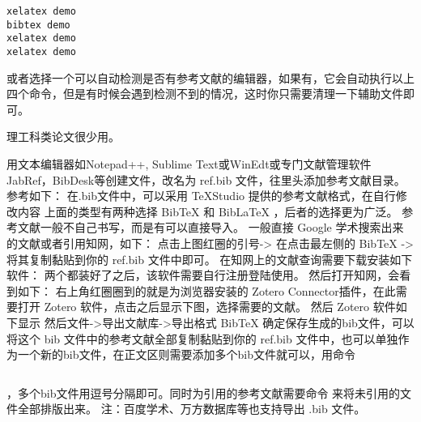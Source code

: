 \begin{verbatim}
xelatex demo
bibtex demo
xelatex demo
xelatex demo
\end{verbatim}

或者选择一个可以自动检测是否有参考文献的编辑器，如果有，它会自动执行以上四个命令，但是有时候会遇到检测不到的情况，这时你只需要清理一下辅助文件即可。



理工科类论文很少用。



用文本编辑器如Notepad++, Sublime
Text或WinEdt或专门文献管理软件JabRef，BibDesk等创建文件，改名为 ref.bib
文件，往里头添加参考文献目录。参考如下：
在.bib文件中，可以采用 TeXStudio 提供的参考文献格式，在自行修改内容
上面的类型有两种选择 BibTeX 和 BibLaTeX ，后者的选择更为广泛。
参考文献一般不自己书写，而是有可以直接导入。 一般直接 Google
学术搜索出来的文献或者引用知网，如下：
点击上图红圈的引号-\textgreater{}
在点击最左侧的 BibTeX -\textgreater{}
将其复制黏贴到你的 ref.bib 文件中即可。
在知网上的文献查询需要下载安装如下软件：
两个都装好了之后，该软件需要自行注册登陆使用。
然后打开知网，会看到如下：
右上角红圈圈到的就是为浏览器安装的 Zotero Connector插件，在此需要打开
Zotero
软件，点击之后显示下图，选择需要的文献。
然后 Zotero 软件如下显示
然后文件-\textgreater{}导出文献库-\textgreater{}导出格式 BibTeX
确定保存生成的bib文件，可以将这个 bib 文件中的参考文献全部复制黏贴到你的
ref.bib
文件中，也可以单独作为一个新的bib文件，在正文区则需要添加多个bib文件就可以，用命令
\begin{verbatim}

\end{verbatim}

，多个bib文件用逗号分隔即可。同时为引用的参考文献需要命令 \nocite{*}
来将未引用的文件全部排版出来。 注：百度学术、万方数据库等也支持导出 .bib
文件。


